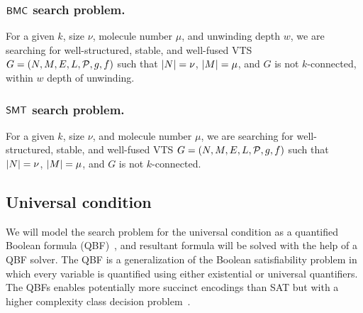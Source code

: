 \subsubsection{$\mathsf{BMC}$ search problem.}
For a given $k$, size $\nu$, molecule number $\mu$, and unwinding depth $w$,
we are searching for well-structured, stable, and well-fused VTS
$G = (N,M,E,L,\mathcal{P},g,f)$ such that
$|N| = \nu$, $|M| = \mu$, and $G$ is not $k$-connected, within $w$ depth of unwinding.    

\subsubsection{$\mathsf{SMT}$ search problem.}
For a given $k$, size $\nu$, and molecule number $\mu$,
we are searching for well-structured, stable, and well-fused VTS
$G = (N,M,E,L,\mathcal{P},g,f)$ such that
$|N| = \nu$, $|M| = \mu$, and
$G$ is not $k$-connected.    

%
%
%
%

\subsection{Universal condition}
\noindent We will model the search problem for the universal condition as a quantified Boolean formula (QBF)~\cite{buning2009theory, benedetti2008qbf}, and resultant formula will be solved with the help of a QBF solver.
%
The QBF is a generalization of the Boolean satisfiability problem in which every variable is quantified using either existential or universal quantifiers.
%
The QBFs enables potentially more succinct encodings than SAT but with a higher complexity class decision problem~\cite{buning2009theory}.
 
